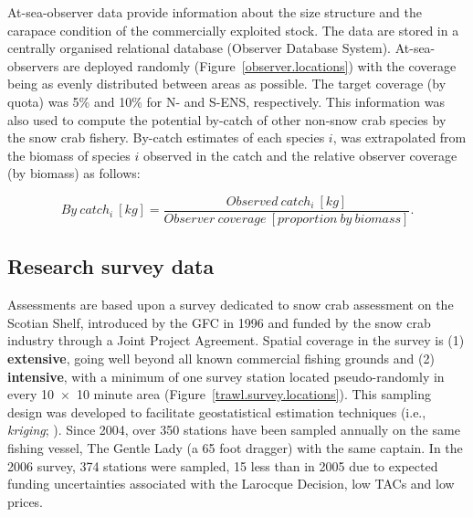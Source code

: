 \documentclass[11pt]{article}
\newcommand{\mult}{$\times$}
\begin{document}
At-sea-observer data provide information about the size structure and the carapace condition of the commercially exploited stock. The data are stored in a centrally organised relational database (Observer Database System). At-sea-observers are deployed randomly (Figure~\ref{observer.locations}) with the coverage being as evenly distributed between areas as possible. The target coverage (by quota) was 5\% and 10\% for N- and S-ENS, respectively. This information was also used to compute the potential by-catch of other non-snow crab species by the snow crab fishery. By-catch estimates of each species $i$, was extrapolated from the biomass of species $i$ observed in the catch and the relative observer coverage (by biomass) as follows:

\begin{equation}
  By \: catch_{i} \: [kg] = \dfrac{ Observed \: catch_{i} \: [kg] } { Observer \: coverage \: [proportion \: by \: biomass]} .
\end{equation}


\subsection{Research survey data}

Assessments are based upon a survey dedicated to snow crab assessment on the Scotian Shelf, introduced by the GFC in 1996 \citep{Biron1997} and funded by the snow crab industry through a Joint Project Agreement. Spatial coverage in the survey is (1) \textbf{extensive}, going well beyond all known commercial fishing grounds and (2) \textbf{intensive}, with a minimum of one survey station located pseudo-randomly in every 10~\mult~10 minute area (Figure~\ref{trawl.survey.locations}). This sampling design was developed to facilitate geostatistical estimation techniques (i.e., \textit{kriging}; \citealt{Cressie1993, legendre1998, Kern2000}). Since 2004, over 350 stations have been sampled annually on the same fishing vessel, The Gentle Lady (a 65 foot dragger) with the same captain. In the 2006 survey, 374 stations were sampled, 15 less than in 2005 due to expected funding uncertainties associated with the Larocque Decision, low TACs and low prices.
\end{document}
